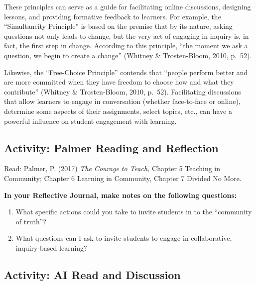 \documentclass[
]{book}
\providecommand{\tightlist}{%
  \setlength{\itemsep}{0pt}\setlength{\parskip}{0pt}}
\begin{document}
These principles can serve as a guide for facilitating online discussions, designing lessons, and providing formative feedback to learners. For example, the ``Simultaneity Principle'' is based on the premise that by its nature, asking questions not only leads to change, but the very act of engaging in inquiry is, in fact, the first step in change. According to this principle, ``the moment we ask a question, we begin to create a change'' (Whitney \& Trosten-Bloom, 2010, p.~52).

Likewise, the ``Free-Choice Principle'' contends that ``people perform better and are more committed when they have freedom to choose how and what they contribute'' (Whitney \& Trosten-Bloom, 2010, p.~52). Facilitating discussions that allow learners to engage in conversation (whether face-to-face or online), determine some aspects of their assignments, select topics, etc., can have a powerful influence on student engagement with learning.

\hypertarget{activity-palmer-reading-and-reflection-1}{%
\subsection*{Activity: Palmer Reading and Reflection}\label{activity-palmer-reading-and-reflection-1}}

\begin{reflect}
Read: Palmer, P. (2017) \emph{The Courage to Teach,} Chapter 5 Teaching in Community; Chapter 6 Learning in Community, Chapter 7 Divided No More.

\textbf{In your Reflective Journal, make notes on the following questions:}

\begin{enumerate}
\def\labelenumi{\arabic{enumi}.}
\tightlist
\item
  What specific actions could you take to invite students in to the ``community of truth''?
\item
  What questions can I ask to invite students to engage in collaborative, inquiry-based learning?
\end{enumerate}
\end{reflect}

\hypertarget{activity-ai-read-and-discussion}{%
\subsection*{Activity: AI Read and Discussion}\label{activity-ai-read-and-discussion}}
\end{document}
